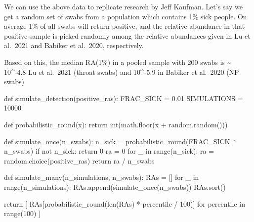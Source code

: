 \documentclass[
  letterpaper,
  DIV=11,
  numbers=noendperiod]{scrartcl}
\newenvironment{Shaded}{\begin{snugshade}}{\end{snugshade}}
\newcommand{\BuiltInTok}[1]{\textcolor[rgb]{0.00,0.23,0.31}{#1}}
\newcommand{\ControlFlowTok}[1]{\textcolor[rgb]{0.00,0.23,0.31}{#1}}
\newcommand{\DecValTok}[1]{\textcolor[rgb]{0.68,0.00,0.00}{#1}}
\newcommand{\FloatTok}[1]{\textcolor[rgb]{0.68,0.00,0.00}{#1}}
\newcommand{\KeywordTok}[1]{\textcolor[rgb]{0.00,0.23,0.31}{#1}}
\newcommand{\NormalTok}[1]{\textcolor[rgb]{0.00,0.23,0.31}{#1}}
\newcommand{\OperatorTok}[1]{\textcolor[rgb]{0.37,0.37,0.37}{#1}}
\begin{document}
We can use the above data to replicate research by Jeff Kaufman. Let's
say we get a random set of swabs from a population which contains 1\%
sick people. On average 1\% of all swabs will return positive, and the
relative abundance in that positive sample is picked randomly among the
relative abundances given in Lu et al.~2021 and Babiker et al.~2020,
respectively.

Based on this, the median RA(1\%) in a pooled sample with 200 swabs is
\textasciitilde{} 10\^{}-4.8 Lu et al.~2021 (throat swabs) and
10\^{}-5.9 in Babiker et al.~2020 (NP swabs)

\begin{Shaded}
\begin{Highlighting}[]
\KeywordTok{def}\NormalTok{ simulate\_detection(positive\_ras):}
\NormalTok{    FRAC\_SICK }\OperatorTok{=} \FloatTok{0.01}
\NormalTok{    SIMULATIONS }\OperatorTok{=} \DecValTok{10000}

    \KeywordTok{def}\NormalTok{ probabilistic\_round(x):}
        \ControlFlowTok{return} \BuiltInTok{int}\NormalTok{(math.floor(x }\OperatorTok{+}\NormalTok{ random.random()))}

    \KeywordTok{def}\NormalTok{ simulate\_once(n\_swabs):}
\NormalTok{        n\_sick }\OperatorTok{=}\NormalTok{ probabilistic\_round(FRAC\_SICK }\OperatorTok{*}\NormalTok{ n\_swabs)}
        \ControlFlowTok{if} \KeywordTok{not}\NormalTok{ n\_sick:}
            \ControlFlowTok{return} \DecValTok{0}
\NormalTok{        ra }\OperatorTok{=} \DecValTok{0}
        \ControlFlowTok{for}\NormalTok{ \_ }\KeywordTok{in} \BuiltInTok{range}\NormalTok{(n\_sick):}
\NormalTok{            ra }\OperatorTok{=}\NormalTok{ random.choice(positive\_ras)}
        \ControlFlowTok{return}\NormalTok{ ra }\OperatorTok{/}\NormalTok{ n\_swabs}

    \KeywordTok{def}\NormalTok{ simulate\_many(n\_simulations, n\_swabs):}
\NormalTok{        RAs }\OperatorTok{=}\NormalTok{ []}
        \ControlFlowTok{for}\NormalTok{ \_ }\KeywordTok{in} \BuiltInTok{range}\NormalTok{(n\_simulations):}
\NormalTok{            RAs.append(simulate\_once(n\_swabs))}
\NormalTok{        RAs.sort()}

        \ControlFlowTok{return}\NormalTok{ [}
\NormalTok{            RAs[probabilistic\_round(}\BuiltInTok{len}\NormalTok{(RAs) }\OperatorTok{*}\NormalTok{ percentile }\OperatorTok{/} \DecValTok{100}\NormalTok{)]}
            \ControlFlowTok{for}\NormalTok{ percentile }\KeywordTok{in} \BuiltInTok{range}\NormalTok{(}\DecValTok{100}\NormalTok{)}
\NormalTok{        ]}


\end{Highlighting}
\end{Shaded}
\end{document}

